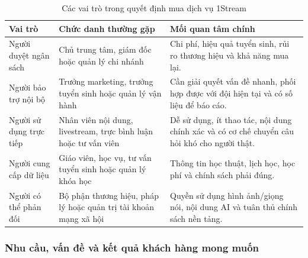\begin{table}[H]
    \centering
    \small
    \setlength{\tabcolsep}{4pt}
    \renewcommand{\arraystretch}{1.25}
    \caption{Các vai trò trong quyết định mua dịch vụ 1Stream}
    \label{tab:buying-center-1stream}
    \begin{tabularx}{\linewidth}{@{}L{2.6cm}L{3.2cm}Y@{}}
        \toprule
        \textbf{Vai trò} & \textbf{Chức danh thường gặp} & \textbf{Mối quan tâm chính} \\ \midrule
        Người duyệt ngân sách & Chủ trung tâm, giám đốc hoặc quản lý chi nhánh &
        Chi phí, hiệu quả tuyển sinh, rủi ro thương hiệu và khả năng mua lại. \\
        Người bảo trợ nội bộ & Trưởng marketing, trưởng tuyển sinh hoặc quản lý
        vận hành &
        Cần giải quyết vấn đề nhanh, phối hợp được với đội hiện tại và có số liệu
        để báo cáo. \\
        Người sử dụng trực tiếp & Nhân viên nội dung, livestream, trực bình luận
        hoặc tư vấn viên &
        Dễ sử dụng, ít thao tác, nội dung chính xác và có cơ chế chuyển câu hỏi
        khó cho người thật. \\
        Người cung cấp dữ liệu & Giáo viên, học vụ, tư vấn tuyển sinh hoặc quản lý
        khóa học &
        Thông tin học thuật, lịch học, học phí và chính sách phải đúng. \\
        Người có thể phản đối & Bộ phận thương hiệu, pháp lý hoặc quản trị tài
        khoản mạng xã hội &
        Quyền sử dụng hình ảnh/giọng nói, nội dung AI và tuân thủ chính sách nền
        tảng. \\ \bottomrule
    \end{tabularx}
\end{table}

\subsubsection{Nhu cầu, vấn đề và kết quả khách hàng mong muốn}

